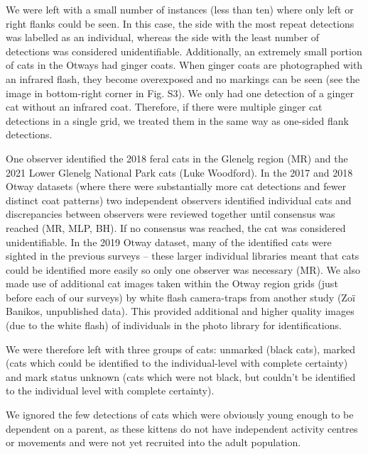 \documentclass[11pt,a4paper,titlepage,twoside,openright]{style/unimelbthesis}
\begin{document}
\begin{mainmatter}
We were left with a small number of instances (less than ten) where only left or right flanks could be seen. In this case, the side with the most repeat detections was labelled as an individual, whereas the side with the least number of detections was considered unidentifiable. Additionally, an extremely small portion of cats in the Otways had ginger coats. When ginger coats are photographed with an infrared flash, they become overexposed and no markings can be seen (see the image in bottom-right corner in Fig. S3). We only had one detection of a ginger cat without an infrared coat. Therefore, if there were multiple ginger cat detections in a single grid, we treated them in the same way as one-sided flank detections.

One observer identified the 2018 feral cats in the Glenelg region (MR) and the 2021 Lower Glenelg National Park cats (Luke Woodford). In the 2017 and 2018 Otway datasets (where there were substantially more cat detections and fewer distinct coat patterns) two independent observers identified individual cats and discrepancies between observers were reviewed together until consensus was reached (MR, MLP, BH). If no consensus was reached, the cat was considered unidentifiable. In the 2019 Otway dataset, many of the identified cats were sighted in the previous surveys -- these larger individual libraries meant that cats could be identified more easily so only one observer was necessary (MR). We also made use of additional cat images taken within the Otway region grids (just before each of our surveys) by white flash camera-traps from another study (Zoï Banikos, unpublished data). This provided additional and higher quality images (due to the white flash) of individuals in the photo library for identifications.

We were therefore left with three groups of cats: unmarked (black cats), marked (cats which could be identified to the individual-level with complete certainty) and mark status unknown (cats which were not black, but couldn't be identified to the individual level with complete certainty).

We ignored the few detections of cats which were obviously young enough to be dependent on a parent, as these kittens do not have independent activity centres or movements and were not yet recruited into the adult population.

\newpage

\(~\)

\(~\)

\(~\)
\begin{figure}


\end{figure}
\end{mainmatter}
\end{document}
